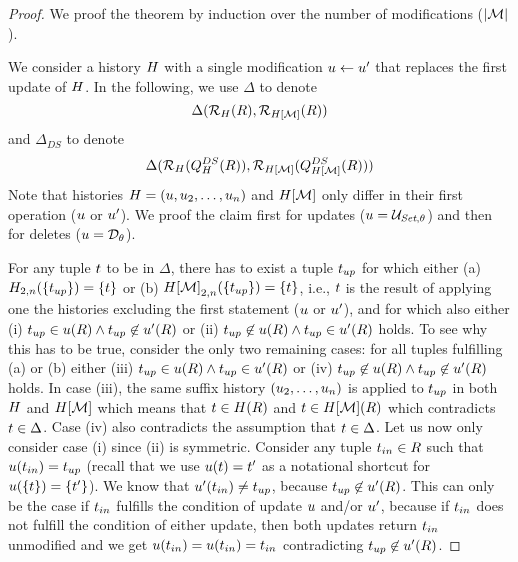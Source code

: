 % 
% 
% 
% 
% 
% 
% 
% 
% 
% 
% 
% 
% 
% 
% 
% 
% 

\newcommand{\tupin}{\tup_{in}}
\newcommand{\tupup}{\tup_{up}}
\newcommand{\dfull}{\Delta}
\newcommand{\dslice}{\Delta_{DS}}

\begin{proof}
  We proof the theorem by induction over the number of modifications ($\left|{\mathcal{M}}\right|$).

  We consider a history $H$ with a single modification $u \gets u'$ that replaces the first update of $H$.
  In the following, we use $\dfull$ to denote
  \[
    \Delta(\mathcal{R}_{H}(R),\mathcal{R}_{H[\mathcal{M}]}(R))
  \]
  and $\dslice$ to denote
  \[
    \Delta(\mathcal{R}_{H}(Q_{H}^{DS}(R)),\mathcal{R}_{H[\mathcal{M}]}(Q_{H[\mathcal{M}]}^{DS}(R)))
    \]
    Note that histories $H = (u, u_2, \ldots, u_n)$ and $H[\mathcal{M}]$ only differ in their first operation ($u$ or $u'$). We proof the claim first for updates ($\up = \aupdate$) and then for deletes ($u = \mathcal{D}_{\theta}$).

\proofpar{$\up = \aupdate$:}
%
For any tuple $t$ to be in $\dfull$, there has to exist a tuple $\tupup$ for which either (a)  $\histslice{2}{n}(\{\tupup\}) = \{\tup\}$ or (b) $\hsliceOf{\ahmod}{2}{n}(\{\tupup\}) = \{\tup\}$, i.e., $t$ is the result of applying one the histories excluding the first statement ($u$ or $u'$), and for which also either (i) $\tupup \in \up(\rel) \land \tupup \not\in \up'(\rel)$ or (ii) $\tupup \not\in \up(\rel) \land \tupup \in \up'(\rel)$ holds. To see why this has to be true, consider the only two remaining cases: for all tuples fulfilling (a) or (b) either (iii) $\tupup \in \up(\rel) \land \tupup \in \up'(\rel)$ or (iv) $\tupup \not\in \up(\rel) \land \tupup \not\in \up'(\rel)$ holds. In case (iii), the same suffix history $(u_2, \ldots, u_n)$ is applied to $\tupup$ in both $H$ and $H[\mathcal{M}]$ which means that $t \in H(R)$ and $t \in H[\mathcal{M}](R)$ which contradicts $\tup \in \dfull$. Case (iv) also contradicts the assumption that  $\tup \in \dfull$.
  Let us now only consider case (i) since (ii) is symmetric. Consider any tuple $\tupin \in \rel$ such that $\up(\tupin) = \tupup$ (recall that we use $u(t) = t'$ as a notational shortcut for $u(\{t\}) = \{t'\}$). We know that $\up'(\tupin) \neq \tupup$, because $\tupup \not\in \up'(\rel)$. This can only be the case if $\tupin$ fulfills the condition of update $u$ and/or $u'$, because if $\tupin$ does not fulfill the condition of either update, then both updates return $\tupin$ unmodified and we get $\up(\tupin) = \up(\tupin) = \tupin$ contradicting $\tupup \not\in \up'(\rel)$.


\end{proof}
